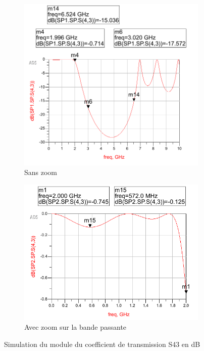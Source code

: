 \documentclass[french]{article}
\begin{document}
\begin{figure}[H]
	\centering
	\begin{subfigure}[b]{0.49\textwidth}
		\includegraphics[width=\textwidth]{photo/passe_bas_vic/simu_passe_bas_distribue.PNG}
		\caption{Sans zoom}
		\label{fig:simu_passe_bas_distribue}
	\end{subfigure}
	\begin{subfigure}[b]{0.49\textwidth}
		\includegraphics[width=\textwidth]{photo/passe_bas_vic/simu_zoom_passe_bas_distribue.PNG}
		\caption{Avec zoom sur la bande passante}
		\label{fig:simu_zoom_passe_bas_distribue}
	\end{subfigure}
	\caption{Simulation du module du coefficient de transmission S43 en dB}
\end{figure}
\end{document}
